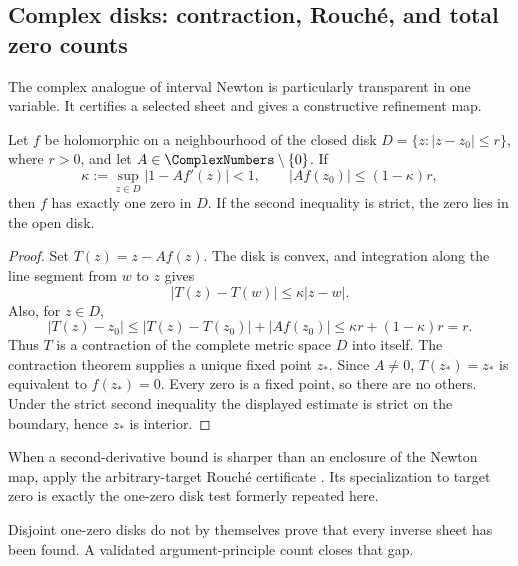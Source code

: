 \subsection{Complex disks: contraction, Rouch\'e, and total zero counts}
\label{sec:complex-branch-certification}

The complex analogue of interval Newton is particularly transparent in one
variable.  It certifies a selected sheet and gives a constructive refinement
map.

\begin{theorem}
\label{thm:complex-krawczyk-disk}
Let \(f\) be holomorphic on a neighbourhood of the closed disk
\(D=\{z:\lvert z-z_0\rvert\le r\}\), where \(r>0\), and let
\(A\in\ComplexNumbers\setminus\{0\}\).  If
\[
 \kappa:=\sup_{z\in D}\lvert1-Af'(z)\rvert<1,
 \qquad
 \lvert Af(z_0)\rvert\le(1-\kappa)r,
\]
then \(f\) has exactly one zero in \(D\).  If the second inequality is strict,
the zero lies in the open disk.
\end{theorem}

\begin{proof}
Set \(T(z)=z-Af(z)\).  The disk is convex, and integration along the line
segment from \(w\) to \(z\) gives
\[
 \lvert T(z)-T(w)\rvert
 \le\kappa\lvert z-w\rvert.
\]
Also, for \(z\in D\),
\[
 \lvert T(z)-z_0\rvert
 \le\lvert T(z)-T(z_0)\rvert+\lvert Af(z_0)\rvert
 \le\kappa r+(1-\kappa)r=r.
\]
Thus \(T\) is a contraction of the complete metric space \(D\) into itself.
The contraction theorem supplies a unique fixed point \(z_*\).  Since
\(A\ne0\), \(T(z_*)=z_*\) is equivalent to \(f(z_*)=0\).  Every zero is a fixed
point, so there are no others.  Under the strict second inequality the
displayed estimate is strict on the boundary, hence \(z_*\) is interior.
\end{proof}

When a second-derivative bound is sharper than an enclosure of the Newton map,
apply the arbitrary-target Rouch\'e certificate
.  Its specialization to target zero is
exactly the one-zero disk test formerly repeated here.

Disjoint one-zero disks do not by themselves prove that every inverse sheet
has been found.  A validated argument-principle count closes that gap.

